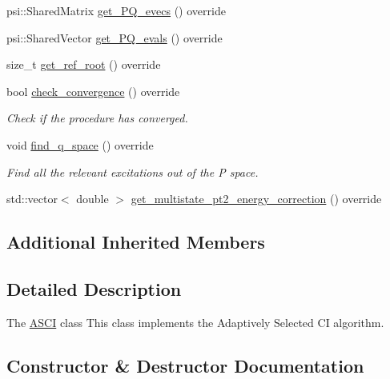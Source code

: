 \begin{DoxyCompactItemize}
psi\+::\+Shared\+Matrix \mbox{\hyperlink{classforte_1_1_a_s_c_i_a7b0cff30856eb70d451216e5039e15ee}{get\+\_\+\+P\+Q\+\_\+evecs}} () override
\item 
psi\+::\+Shared\+Vector \mbox{\hyperlink{classforte_1_1_a_s_c_i_a13310cf1f39f174d298194efea95572f}{get\+\_\+\+P\+Q\+\_\+evals}} () override
\item 
size\+\_\+t \mbox{\hyperlink{classforte_1_1_a_s_c_i_aa81094a460d7922927d4ff9f14929ab8}{get\+\_\+ref\+\_\+root}} () override
\item 
bool \mbox{\hyperlink{classforte_1_1_a_s_c_i_a933b12da75f3baa3a824839f7a3f760b}{check\+\_\+convergence}} () override
\begin{DoxyCompactList}\small\item\em Check if the procedure has converged. \end{DoxyCompactList}\item 
void \mbox{\hyperlink{classforte_1_1_a_s_c_i_a197192d707eee6c0c6046d3dfdf78162}{find\+\_\+q\+\_\+space}} () override
\begin{DoxyCompactList}\small\item\em Find all the relevant excitations out of the P space. \end{DoxyCompactList}\item 
std\+::vector$<$ double $>$ \mbox{\hyperlink{classforte_1_1_a_s_c_i_ac497073adeab7700979678c15dcb475e}{get\+\_\+multistate\+\_\+pt2\+\_\+energy\+\_\+correction}} () override
\end{DoxyCompactItemize}
\subsection*{Additional Inherited Members}


\subsection{Detailed Description}
The \mbox{\hyperlink{classforte_1_1_a_s_c_i}{A\+S\+CI}} class This class implements the Adaptively Selected CI algorithm. 

\subsection{Constructor \& Destructor Documentation}
\mbox{\label{classforte_1_1_a_s_c_i_a3640cec78b82f59f8afe187b94900f7d}} 
